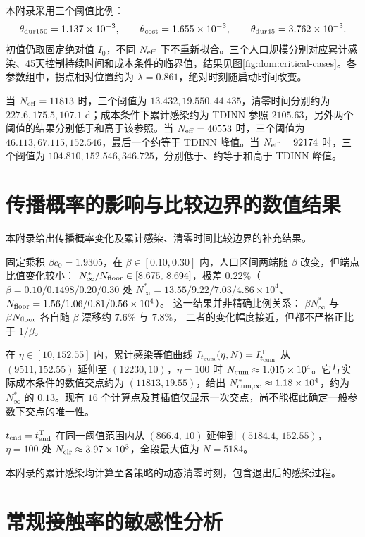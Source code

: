 \documentclass[lang=cn,a4paper,newtx]{elegantpaper}
\numberwithin{equation}{section}
\theoremstyle{plain}
\newcommand{\Itcum}{I_{t_{\mathrm{cum}}}}
\begin{document}
本附录采用三个阈值比例：
\[
\theta_{\rm dur150}=1.137\times10^{-3},\qquad
\theta_{\rm cost}=1.655\times10^{-3},\qquad
\theta_{\rm dur45}=3.762\times10^{-3}.
\]
初值仍取固定绝对值 $I_0$，不同 $N_{\rm eff}$ 下不重新拟合。三个人口规模分别对应累计感染、45天控制持续时间和成本条件的临界值，结果见图\ref{fig:dom:critical-cases}。各参数组中，拐点相对位置约为 $\lambda=0.861$，绝对时刻随启动时间改变。

当 $N_{\rm eff}=11813$ 时，三个阈值为 $13.432,19.550,44.435$，清零时间分别约为 $227.6,175.5,107.1$ d；成本条件下累计感染约为 TDINN 参照 $2105.63$，另外两个阈值的结果分别低于和高于该参照。当 $N_{\rm eff}=40553$ 时，三个阈值为 $46.113,67.115,152.546$，最后一个约等于 TDINN 峰值。当 $N_{\rm eff}=92174$ 时，三个阈值为 $104.810,152.546,346.725$，分别低于、约等于和高于 TDINN 峰值。



\FloatBarrier
\section{传播概率的影响与比较边界的数值结果}
\label{app:dom:numerics}

本附录给出传播概率变化及累计感染、清零时间比较边界的补充结果。

固定乘积 $\beta c_0=1.9305$，在 $\beta\in[0.10,0.30]$ 内，人口区间两端随 $\beta$ 改变，但端点比值变化较小：
$N^\ast_\infty/N_{\rm floor}\in[8.675,\,8.694]$，极差 $0.22\%$（$\beta=0.10/0.1498/0.20/0.30$ 处
$N^\ast_\infty=13.55/9.22/7.03/4.86\times10^4$、$N_{\rm floor}=1.56/1.06/0.81/0.56\times10^4$）。
这一结果并非精确比例关系：
$\beta N^\ast_\infty$ 与 $\beta N_{\rm floor}$ 各自随 $\beta$ 漂移约 $7.6\%$ 与 $7.8\%$，
二者的变化幅度接近，但都不严格正比于 $1/\beta$。

在 $\eta\in[10,152.55]$ 内，累计感染等值曲线 $\Itcum(\eta,N)=\Itcum^{\rm T}$ 从 $(9511,152.55)$ 延伸至 $(12230,10)$，$\eta=100$ 时 $N_{\rm cum}\approx1.015\times10^4$。它与实际成本条件的数值交点约为 $(11813,19.55)$，给出 $N_{\rm cum,\infty}^\ast\approx1.18\times10^4$，约为 $N^\ast_\infty$ 的 $0.13$。现有 $16$ 个计算点及其插值仅显示一次交点，尚不能据此确定一般参数下交点的唯一性。

$t_{\rm end}=t_{\rm end}^{\rm T}$ 在同一阈值范围内从 $(866.4,\,10)$ 延伸到 $(5184.4,\,152.55)$，
$\eta=100$ 处 $N_{\rm clr}\approx3.97\times10^{3}$，全段最大值为 $N=5184$。

本附录的累计感染均计算至各策略的动态清零时刻，包含退出后的感染过程。

\FloatBarrier

\section{常规接触率的敏感性分析}
\label{app:c0_scan}
\end{document}
